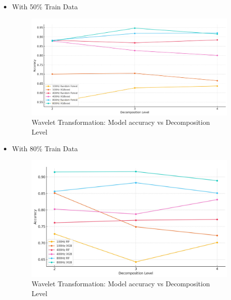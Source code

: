 \documentclass{article}
\begin{document}
\begin{itemize}
\begin{itemize}
\begin{figure}[h]
                    \label{fig:Wavelet_transformation_20}
                \end{figure}
            \vspace{0.8cm}
            \item With 50\% Train Data
                \begin{figure}[H]
                    \centering
                    \includegraphics[width=1\linewidth]{wavelet_50_percent.jpg}
                    \caption{Wavelet Transformation: Model accuracy vs Decomposition Level}
                    \label{fig:Wavelet_transformation_50}
                \end{figure}
            \vspace{0.8cm}  
            \item With 80\% Train Data
                \begin{figure}[h]
                    \centering
                    \includegraphics[width=1\linewidth]{wavelet_80_percent.jpg}
                    \caption{Wavelet Transformation: Model accuracy vs Decomposition Level}
                    \label{fig:Wavelet_transformation_80}
                \end{figure}

\end{itemize}
\end{itemize}
\end{document}
